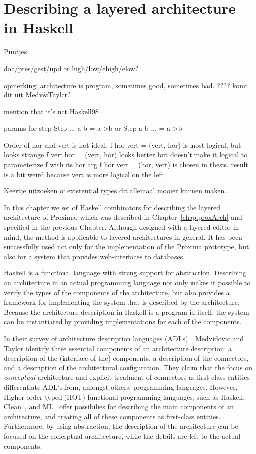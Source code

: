 \chapter{Describing a layered architecture in Haskell} \label{chap:archCombs}

\bc
Puntjes

doc/pres/gest/upd or high/low/ehigh/elow?

opmerking: architecture is program, sometimes good, sometimes bad. ???? komt dit uit Medv&Taylor?

mention that it's not Haskell98

params for step Step ... a b = a->b or Step a b ... = a->b


Order of hor and vert is not ideal.  
f hor vert = (vert, hor) is most logical, but looks strange
f vert hor = (vert, hor) looks better but doesn't make it logical to parameterize f with its hor arg
f hor vert = (hor, vert) is chosen in thesis. result is a bit weird because vert is more logical on the left


Keertje uitzoeken of existential types dit allemaal mooier kunnen maken.
\ec



In this chapter we set of Haskell combinators for describing the layered architecture of Proxima, which was described in Chapter~\ref{chap:proxArch} and specified in the previous Chapter. Although designed with a layered editor in mind, the method is applicable to layered architectures in general. It has been successfully used not only for the implementation of the Proxima prototype, but also for a system that provides web-interfaces to databases. 

Haskell is a functional language with strong support for abstraction. Describing an architecture in an actual programming language not only makes it possible to verify the types of the components of the architecture, but also provides a framework for implementing the system that is described by the architecture. Because the architecture description in Haskell is a program in itself, the system can be instantiated by providing implementations for each of the components.

In their survey of architecture description languages (ADLs)~\cite{medvidovic00ADLs}, Medvidovic and Taylor identify three essential components of an architecture description: a description of the (interface of the) components, a description of the connectors, and a description of the architectural configuration. They claim that the focus on {\em conceptual} architecture and explicit treatment of connectors as first-class entities differentiate ADL's from, amongst others, programming languages. However, Higher-order typed (HOT) functional programming languages, such as Haskell, Clean~\cite{plasmeijer01clean}, and ML~\cite{milner97ML} offer possibilies for describing the main components of an architecture, and treating all of these components as first-class entities. Furthermore, by using abstraction, the description of the architecture can be focused on the conceptual architecture, while the details are left to the actual components.

